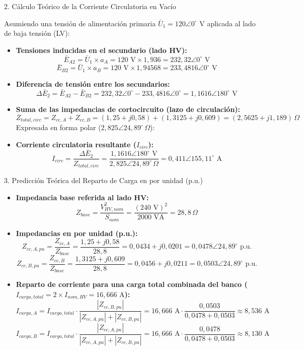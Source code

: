 2. Cálculo Teórico de la Corriente Circulatoria en Vacío

Asumiendo una tensión de alimentación primaria $\bar{U}_1 = 120\angle 0^\circ\text{ V}$ aplicada al lado de baja tensión (LV):

\begin{itemize}
    \item \textbf{Tensiones inducidas en el secundario (lado HV):}
        $$\bar{E}_{A2} = \bar{U}_1 \times a_A = 120\text{ V} \times 1,936 = 232,32\angle 0^\circ\text{ V}$$
        $$\bar{E}_{B2} = \bar{U}_1 \times a_B = 120\text{ V} \times 1,94568 = 233,4816\angle 0^\circ\text{ V}$$
    \item \textbf{Diferencia de tensión entre los secundarios:}
        $$\Delta \bar{E}_2 = \bar{E}_{A2} - \bar{E}_{B2} = 232,32\angle 0^\circ - 233,4816\angle 0^\circ = 1,1616\angle 180^\circ\text{ V}$$
    \item \textbf{Suma de las impedancias de cortocircuito (lazo de circulación):}
        $$Z_{total,circ} = Z_{cc,A} + Z_{cc,B} = (1,25 + j0,58) + (1,3125 + j0,609) = (2,5625 + j1,189)\,\Omega$$
        Expresada en forma polar ($2,825\angle 24,89^\circ\,\Omega$):
    \item \textbf{Corriente circulatoria resultante ($I_{circ}$):}
        $$I_{circ} = \frac{\Delta \bar{E}_2}{Z_{total,circ}} = \frac{1,1616\angle 180^\circ\text{ V}}{2,825\angle 24,89^\circ\,\Omega} = 0,411\angle 155,11^\circ\text{ A}$$
\end{itemize}

3. Predicción Teórica del Reparto de Carga en por unidad (p.u.)

\begin{itemize}
    \item \textbf{Impedancia base referida al lado HV:}
        $$Z_{base} = \frac{V_{HV,nom}^2}{S_{nom}} = \frac{(240\text{ V})^2}{2000\text{ VA}} = 28,8\,\Omega$$
    \item \textbf{Impedancias en por unidad (p.u.):}
        $$Z_{cc,A,pu} = \frac{Z_{cc,A}}{Z_{base}} = \frac{1,25 + j0,58}{28,8} = 0,0434 + j0,0201 = 0,0478\angle 24,89^\circ\text{ p.u.}$$
        $$Z_{cc,B,pu} = \frac{Z_{cc,B}}{Z_{base}} = \frac{1,3125 + j0,609}{28,8} = 0,0456 + j0,0211 = 0,0503\angle 24,89^\circ\text{ p.u.}$$
    \item \textbf{Reparto de corriente para una carga total combinada del banco ($I_{carga,total} = 2 \times I_{nom,HV} = 16,666\text{ A}$):}
        $$I_{carga,A} = I_{carga,total} \cdot \frac{|Z_{cc,B,pu}|}{|Z_{cc,A,pu}| + |Z_{cc,B,pu}|} = 16,666\text{ A} \cdot \frac{0,0503}{0,0478 + 0,0503} \approx 8,536\text{ A}$$
        $$I_{carga,B} = I_{carga,total} \cdot \frac{|Z_{cc,A,pu}|}{|Z_{cc,A,pu}| + |Z_{cc,B,pu}|} = 16,666\text{ A} \cdot \frac{0,0478}{0,0478 + 0,0503} \approx 8,130\text{ A}$$
\end{itemize}

